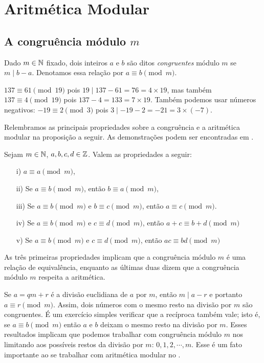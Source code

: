 \chapter{Aritmética Modular}
\label{chap:modular}


\section{A congruência módulo $m$}

Dado $m\in \mathbb{N}$ fixado, dois inteiros $a$ e $b$ são
ditos \emph{congruentes} módulo $m$ se $m \mid b-a$. Denotamos
essa relação por $a \equiv b \pmod m$.

\begin{example}\label{ex:modbas}
  $137 \equiv 61 \pmod{19}$ pois $19 \mid 137-61 = 76 = 4\times 19$,
  mas também $137 \equiv 4 \pmod{19}$ pois $137-4 = 133 = 7\times 19$.
  Também podemos usar números negativos: $-19 \equiv 2 \pmod 3$
  pois $3 \mid -19 - 2 = -21 = 3 \times (-7)$.
\end{example}

Relembramos as principais propriedades sobre a congruência
e a aritmética modular na proposição a seguir. As demonstrações
podem ser encontradas em \cite[Lema 1.1]{tnumgugu}.
\begin{proposition}\label{prop:prarit}
  Sejam $m \in \mathbb{N}$, $a,b,c,d \in \mathbb{Z}$. Valem as propriedades
  a seguir:
  \begin{itemize}
    \item[i)] $a \equiv a \pmod m$,
    \item[ii)] Se $a \equiv b \pmod m$, então $b \equiv a \pmod m$,
    \item[iii)] Se $a\equiv b \pmod m$ e $b \equiv c \pmod m$, então
    $a \equiv c \pmod m$.
    \item[iv)] Se $a\equiv b \pmod m$ e
        $c \equiv d \pmod m$, então $a+c \equiv b+d\pmod m$
    \item[v)] Se $a\equiv b \pmod m$ e $c \equiv d \pmod m$,
        então $ac \equiv bd\pmod m$
  \end{itemize}
\end{proposition}

As três primeiras propriedades implicam que a congruência
módulo $m$ é uma relação de equivalência, enquanto as últimas duas
dizem que a congruência módulo $m$ respeita a aritmética.

Se $a = qm +r$ é a divisão euclidiana de $a$ por $m$,
então $m \mid a-r$ e portanto $a\equiv r \pmod m$. Assim, dois
números com o mesmo resto na divisão por $m$ são congruentes.
É um exercício simples verificar que a recíproca também
vale; isto é, se $a \equiv b\pmod m$ então $a$ e $b$ deixam
o mesmo resto na divisão por $m$. Esses resultados
implicam que podemos trabalhar com congruência
módulo $m$ nos limitando aos possíveis restos 
da divisão por $m$: $0,1,2,\cdots,m$. Esse é um
fato importante ao se trabalhar com aritmética modular
no \sage.

